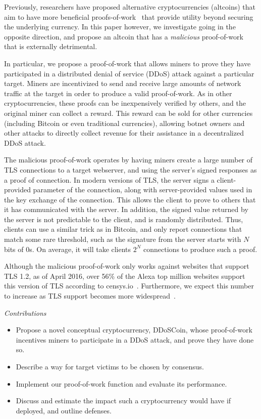 Previously, researchers have proposed alternative cryptocurrencies (altcoins)
that aim to have more beneficial proofs-of-work~\cite{primecoin,permacoin} that
provide utility beyond securing the underlying currency. In this paper however,
we investigate going in the opposite direction, and propose an altcoin that has
a \emph{malicious} proof-of-work that is externally detrimental.

In particular, we propose a proof-of-work that allows miners to prove they have
participated in a distributed denial of service (DDoS) attack against a
particular target. Miners are incentivized to send and receive large amounts of network
traffic at the target in order to produce a valid proof-of-work. As in other
cryptocurrencies, these proofs can be inexpensively verified by others, and the
original miner can collect a reward. This reward can be sold for other
currencies (including Bitcoin or even traditional currencies), allowing botnet
owners and other attacks to directly collect revenue for their assistance
in a decentralized DDoS attack.


The malicious proof-of-work operates by having miners create a large number of
TLS connections to a target webserver, and using the server's signed responses
as a proof of connection. In modern versions of TLS, the server signs a
client-provided parameter of the connection, along with server-provided values
used in the key exchange of the connection. This allows the client to prove to
others that it has communicated with the server. In addition, the signed value
returned by the server is not predictable to the client, and is randomly
distributed. Thus, clients can use a similar trick as in Bitcoin, and only
report connections that match some rare threshold, such as the signature from
the server starts with $N$ bits of 0s. On average, it will take clients $2^{N}$
connections to produce such a proof.

Although the malicious proof-of-work only works against websites that support
TLS 1.2, as of April 2016, over 56\% of the Alexa top million websites support
this version of TLS according to censys.io~\cite{censys}. Furthermore, we
expect this number to increase as TLS support becomes more
widespread~\cite{letsencrypt}.

\emph{Contributions}
\begin{itemize}
\item Propose a novel conceptual cryptocurrency, DDoSCoin, whose proof-of-work
incentives miners to participate in a DDoS attack, and prove they have done so.
\item Describe a way for target victims to be chosen by consensus.
\item Implement our proof-of-work function and evaluate its performance.
\item Discuss and estimate the impact such a cryptocurrency would have if
deployed, and outline defenses.
\end{itemize}

